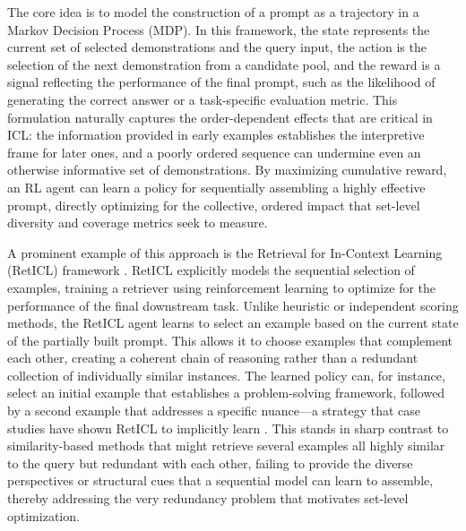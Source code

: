 \documentclass[11pt]{article}
\begin{document}
The core idea is to model the construction of a prompt as a trajectory in a Markov Decision Process (MDP). In this framework, the state represents the current set of selected demonstrations and the query input, the action is the selection of the next demonstration from a candidate pool, and the reward is a signal reflecting the performance of the final prompt, such as the likelihood of generating the correct answer or a task-specific evaluation metric. This formulation naturally captures the order-dependent effects that are critical in ICL: the information provided in early examples establishes the interpretive frame for later ones, and a poorly ordered sequence can undermine even an otherwise informative set of demonstrations. By maximizing cumulative reward, an RL agent can learn a policy for sequentially assembling a highly effective prompt, directly optimizing for the collective, ordered impact that set-level diversity and coverage metrics seek to measure.

A prominent example of this approach is the Retrieval for In-Context Learning (RetICL) framework \cite{ref132}. RetICL explicitly models the sequential selection of examples, training a retriever using reinforcement learning to optimize for the performance of the final downstream task. Unlike heuristic or independent scoring methods, the RetICL agent learns to select an example based on the current state of the partially built prompt. This allows it to choose examples that complement each other, creating a coherent chain of reasoning rather than a redundant collection of individually similar instances. The learned policy can, for instance, select an initial example that establishes a problem-solving framework, followed by a second example that addresses a specific nuance---a strategy that case studies have shown RetICL to implicitly learn \cite{ref132}. This stands in sharp contrast to similarity-based methods that might retrieve several examples all highly similar to the query but redundant with each other, failing to provide the diverse perspectives or structural cues that a sequential model can learn to assemble, thereby addressing the very redundancy problem that motivates set-level optimization.
\end{document}
